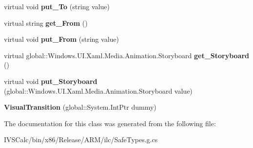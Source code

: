 \begin{DoxyCompactItemize}
virtual void {\bfseries put\+\_\+\+To} (string value)
\item 
\mbox{\label{class_windows_1_1_u_i_1_1_xaml_1_1_visual_transition_a9aa7c36d0dc60308cfeda62679c8e084}} 
virtual string {\bfseries get\+\_\+\+From} ()
\item 
\mbox{\label{class_windows_1_1_u_i_1_1_xaml_1_1_visual_transition_af379d21f8a469ce2c38b93f7b387d5f3}} 
virtual void {\bfseries put\+\_\+\+From} (string value)
\item 
\mbox{\label{class_windows_1_1_u_i_1_1_xaml_1_1_visual_transition_ad0e85cd4965feb0bae3084eee6e188dc}} 
virtual global\+::\+Windows.\+U\+I.\+Xaml.\+Media.\+Animation.\+Storyboard {\bfseries get\+\_\+\+Storyboard} ()
\item 
\mbox{\label{class_windows_1_1_u_i_1_1_xaml_1_1_visual_transition_a84345f3db3f81606783b0b0f12f011dd}} 
virtual void {\bfseries put\+\_\+\+Storyboard} (global\+::\+Windows.\+U\+I.\+Xaml.\+Media.\+Animation.\+Storyboard value)
\item 
\mbox{\label{class_windows_1_1_u_i_1_1_xaml_1_1_visual_transition_a8e9584c6562711665f737ddc44600c07}} 
{\bfseries Visual\+Transition} (global\+::\+System.\+Int\+Ptr dummy)
\end{DoxyCompactItemize}


The documentation for this class was generated from the following file\+:\begin{DoxyCompactItemize}
\item 
I\+V\+S\+Calc/bin/x86/\+Release/\+A\+R\+M/ilc/Safe\+Types.\+g.\+cs\end{DoxyCompactItemize}
